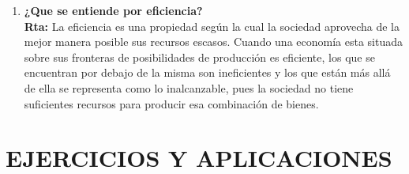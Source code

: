 \documentclass[12pt]{book}
\begin{document}
\begin{enumerate}
\item \textbf{¿Que se entiende por eficiencia?}
\\
\textbf{Rta:} La eficiencia es una propiedad según la cual la sociedad aprovecha de la mejor manera posible sus recursos escasos.
Cuando una economía esta situada sobre sus fronteras de posibilidades de producción es eficiente, los que se encuentran por debajo de la misma son ineficientes y los que están más allá de ella se representa como lo inalcanzable, pues la sociedad no tiene suficientes recursos para producir esa combinación de bienes.

\end{enumerate}

\chapter{EJERCICIOS Y APLICACIONES}
\end{document}
